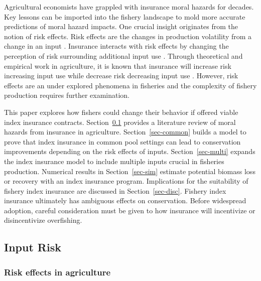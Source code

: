 \documentclass[
  super,
  preprint,
  3p]{elsarticle}
\theoremstyle{plain}
\theoremstyle{plain}
\theoremstyle{remark}
\begin{document}
Agricultural economists have grappled with insurance moral hazards for
decades. Key lessons can be imported into the fishery landscape to mold
more accurate predictions of moral hazard impacts. One crucial insight
originates from the notion of risk effects. Risk effects are the changes
in production volatility from a change in an input \citep{Just1979}.
Insurance interacts with risk effects by changing the perception of risk
surrounding additional input use \citep{Ramaswami1993}. Through
theoretical and empirical work in agriculture, it is known that
insurance will increase risk increasing input use while decrease risk
decreasing input use \citep{Mahul2001, Smith1996, horowitz1993}.
However, risk effects are an under explored phenomena in fisheries and
the complexity of fishery production requires further examination.

This paper explores how fishers could change their behavior if offered
viable index insurance contracts. Section~\ref{sec-risk} provides a
literature review of moral hazards from insurance in agriculture.
Section~\ref{sec-common} builds a model to prove that index insurance in
common pool settings can lead to conservation improvements depending on
the risk effects of inputs. Section~\ref{sec-multi} expands the index
insurance model to include multiple inputs crucial in fisheries
production. Numerical results in Section~\ref{sec-sim} estimate
potential biomass loss or recovery with an index insurance program.
Implications for the suitability of fishery index insurance are
discussed in Section~\ref{sec-disc}. Fishery index insurance ultimately
has ambiguous effects on conservation. Before widespread adoption,
careful consideration must be given to how insurance will incentivize or
disincentivize overfishing.

\hypertarget{sec-risk}{%
\subsection{Input Risk}\label{sec-risk}}

\hypertarget{risk-effects-in-agriculture}{%
\subsubsection{Risk effects in
agriculture}\label{risk-effects-in-agriculture}}
\end{document}
